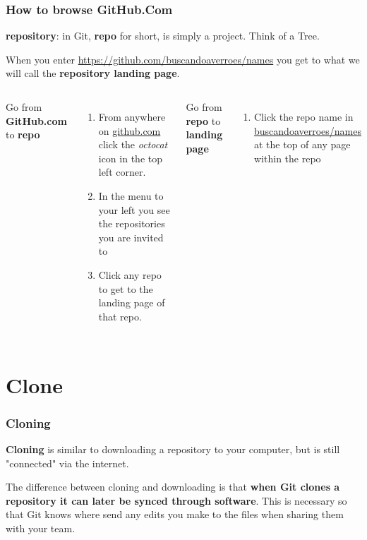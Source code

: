 \documentclass[aspectratio=169]{beamer} %
\newcommand{\trainingURL}[1]{{\color{blue}\url{#1}}}
\newcommand{\traininerUsername}{buscandoaverroes}
\newcommand{\repoName}{\traininerUsername/names}
\newcommand{\trainingRepoURL}[1]{\trainingURL{https://github.com/\repoName #1}}
\begin{document}
\begin{frame}
\frametitle{How to browse GitHub.Com}

	\textbf{repository}: in Git, \textbf{repo} for short, is simply a project. Think of a Tree.
		\vspace{.25cm}

	When you enter \trainingRepoURL{} you get to what we will call the \textbf{repository landing page}.

	\vspace{.25cm}

	\begin{columns}[T]

		Go from \textbf{GitHub.com} to \textbf{repo}
		\begin{enumerate}
			\item From anywhere on \trainingURL{github.com} click the \textit{octocat} icon in the top left corner.
			\item In the menu to your left you see the repositories you are invited to
			\item Click any repo to get to the landing page of that repo.
		\end{enumerate}

		Go from \textbf{repo} to \textbf{landing page}
		\begin{enumerate}
			\item Click the repo name in {\color{blue}\url{\repoName}} at the top of any page within the repo
		\end{enumerate}

	\end{columns}
\end{frame}

\section{Clone}

\begin{frame}
\frametitle{Cloning}

	\textbf{Cloning} is similar to downloading a repository to your computer, but is still "connected" via the internet.

	\vspace{.5cm}

	The difference between cloning and downloading is that \textbf{when Git clones a repository it can later be synced through software}. This is necessary so that Git knows where send any edits you make to the files when sharing them with your team.

\end{frame}
\end{document}
